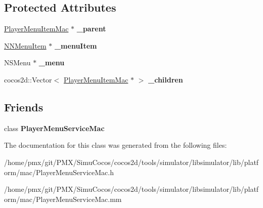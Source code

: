 \subsection*{Protected Attributes}
\begin{DoxyCompactItemize}
\item 
\mbox{\label{classPlayerMenuItemMac_a75f09eab85d08914872f5e86d8551a1b}} 
\hyperlink{classPlayerMenuItemMac}{Player\+Menu\+Item\+Mac} $\ast$ {\bfseries \+\_\+parent}
\item 
\mbox{\label{classPlayerMenuItemMac_aab03ef44314755a562fae5eed90f0630}} 
\hyperlink{interfaceNNMenuItem}{N\+N\+Menu\+Item} $\ast$ {\bfseries \+\_\+menu\+Item}
\item 
\mbox{\label{classPlayerMenuItemMac_a19dfbb585146ebb76bcfd996bb85ab07}} 
N\+S\+Menu $\ast$ {\bfseries \+\_\+menu}
\item 
\mbox{\label{classPlayerMenuItemMac_a7e1ec7b3e1d6f2b8284281850a5bfb74}} 
cocos2d\+::\+Vector$<$ \hyperlink{classPlayerMenuItemMac}{Player\+Menu\+Item\+Mac} $\ast$ $>$ {\bfseries \+\_\+children}
\end{DoxyCompactItemize}
\subsection*{Friends}
\begin{DoxyCompactItemize}
\item 
\mbox{\label{classPlayerMenuItemMac_aaa202fb22015bd0106fae818000495fb}} 
class {\bfseries Player\+Menu\+Service\+Mac}
\end{DoxyCompactItemize}


The documentation for this class was generated from the following files\+:\begin{DoxyCompactItemize}
\item 
/home/pmx/git/\+P\+M\+X/\+Simu\+Cocos/cocos2d/tools/simulator/libsimulator/lib/platform/mac/Player\+Menu\+Service\+Mac.\+h\item 
/home/pmx/git/\+P\+M\+X/\+Simu\+Cocos/cocos2d/tools/simulator/libsimulator/lib/platform/mac/Player\+Menu\+Service\+Mac.\+mm\end{DoxyCompactItemize}
